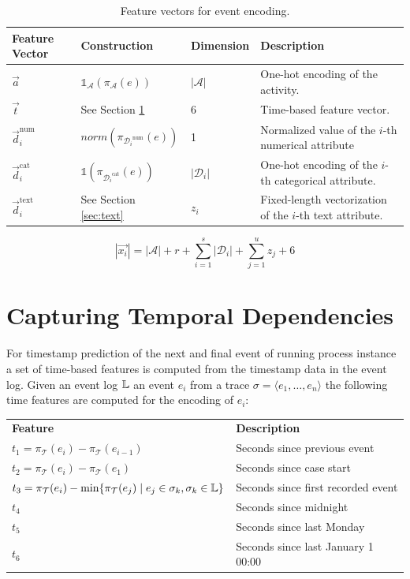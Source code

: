 \begin{table}[!htbp]
\renewcommand{\arraystretch}{1.2}
\begin{tabularx}{\textwidth}{p{2cm} l l p{6.8cm} }
	\toprule
	 \textbf{Feature} \newline \textbf{Vector} & \textbf{Construction} &\textbf{Dimension} &  \textbf{Description} \\
	 \midrule
	 	$\vec{a}$ &$\mathds{1}_\mathcal{A}(\pi_\mathcal{A}(e))$& $|\mathcal{A}|$& One-hot encoding of the activity. \\
	 	$\vec{t}$ & See Section \ref{sec:time} &6 & Time-based feature vector.\\
	 	$\vec{d}_i^\mathrm{num}$ &  $norm(\pi_{{\mathcal{D}_i}^\mathrm{num}}(e)) $ &1 & Normalized value of the $i$-th numerical attribute\\
	 	$\vec{d}_i^\mathrm{cat}$ & $\mathds{1}(\pi_{{\mathcal{D}_i}^\mathrm{cat}}(e))$&$|\mathcal{D}_i|$ & One-hot encoding of the $i$-th categorical attribute.\\
	 	$\vec{d}_i^\mathrm{text}$ & See Section \ref{sec:text} & $z_i$& Fixed-length vectorization of the $i$-th text attribute.\\
	\bottomrule
\end{tabularx}
	\caption{Feature vectors for event encoding.}
	\label{tab:features}
\end{table}

\begin{equation}
	|\vec{x_i}|= |\mathcal{A}| + r + \sum_{i=1}^{s} |\mathcal{D}_i| + \sum_{j=1}^{u} z_j + 6
\end{equation}


\section{Capturing Temporal Dependencies}\label{sec:time}


For timestamp prediction of the next and final event of running process instance a set of time-based features is computed from the timestamp data in the event log.
Given an event log $\mathbb{L}$ an event $e_i$ from a trace $\sigma = \langle e_1, \dots, e_n \rangle$ the following time features are computed for the encoding of $e_i$: 

\begin{center}
\begin{tabularx}{\textwidth}{l l}
	\centering
	 \textbf{Feature} & \textbf{Description} \\
	$t_1 = \pi_\mathcal{T}(e_i) - \pi_\mathcal{T}(e_{i-1})$ & Seconds since previous event \\
	$t_2 = \pi_\mathcal{T}(e_i) - \pi_\mathcal{T}(e_1)$ & Seconds since case start \\
	$t_3 = \pi_\mathcal{T}(e_i) - \min\{\pi_\mathcal{T}(e_{j}) \mid  e_j \in \sigma_k, \sigma_k \in \mathbb{L}\}$ & Seconds since first recorded event \\
	$t_4$ & Seconds since midnight \\
	$t_5$ & Seconds since last Monday \\
	$t_6$ & Seconds since last January 1 00:00
\end{tabularx}
\end{center}

